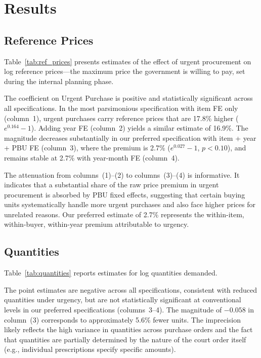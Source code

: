 \section{Results}
\label{sec:results}

\subsection{Reference Prices}
\label{sec:ref_prices}

Table~\ref{tab:ref_prices} presents estimates of the effect of urgent procurement on log reference prices---the maximum price the government is willing to pay, set during the internal planning phase.



The coefficient on Urgent Purchase is positive and statistically significant across all specifications. In the most parsimonious specification with item FE only (column~1), urgent purchases carry reference prices that are 17.8\% higher ($e^{0.164}-1$). Adding year FE (column~2) yields a similar estimate of 16.9\%. The magnitude decreases substantially in our preferred specification with item + year + PBU FE (column~3), where the premium is 2.7\% ($e^{0.027}-1$, $p < 0.10$), and remains stable at 2.7\% with year-month FE (column~4).

The attenuation from columns~(1)--(2) to columns~(3)--(4) is informative. It indicates that a substantial share of the raw price premium in urgent procurement is absorbed by PBU fixed effects, suggesting that certain buying units systematically handle more urgent purchases and also face higher prices for unrelated reasons. Our preferred estimate of 2.7\% represents the within-item, within-buyer, within-year premium attributable to urgency.

\subsection{Quantities}
\label{sec:quantities}

Table~\ref{tab:quantities} reports estimates for log quantities demanded.



The point estimates are negative across all specifications, consistent with reduced quantities under urgency, but are not statistically significant at conventional levels in our preferred specifications (columns~3--4). The magnitude of $-0.058$ in column~(3) corresponds to approximately 5.6\% fewer units. The imprecision likely reflects the high variance in quantities across purchase orders and the fact that quantities are partially determined by the nature of the court order itself (e.g., individual prescriptions specify specific amounts).

